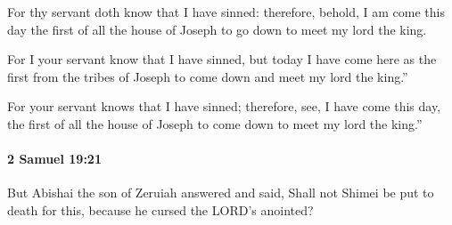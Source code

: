 			\begin{versebox}
					\item[BHS] 
					\item[ASV] For thy servant doth know that I have sinned: therefore, behold, I am come this day the first of all the house of Joseph to go down to meet my lord the king.
					\item[NIV] For I your servant know that I have sinned, but today I have come here as the first from the tribes of Joseph to come down and meet my lord the king.”
					\item[NRSV] For your servant knows that I have sinned; therefore, see, I have come this day, the first of all the house of Joseph to come down to meet my lord the king.”
			\end{versebox}

		\paragraph{2 Samuel 19:21} %
			\label{2SAMUEL-19-21}

			But Abishai the son of Zeruiah answered and said, Shall not Shimei be put to death for this, because he cursed the LORD’s anointed?

